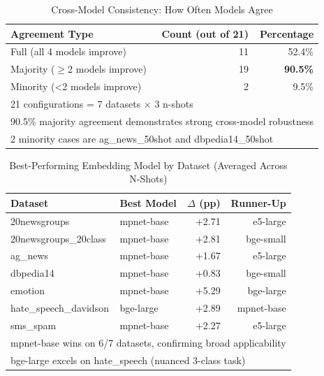 \begin{table}[htbp]
\centering
\caption{Cross-Model Consistency: How Often Models Agree}
\label{tab:embedding_consistency}
\begin{tabular}{lrr}
\toprule
\textbf{Agreement Type} & \textbf{Count (out of 21)} & \textbf{Percentage} \\
\midrule
Full (all 4 models improve)      & 11 & 52.4\% \\
Majority ($\geq$2 models improve) & 19 & \textbf{90.5\%} \\
Minority (<2 models improve)      & 2  & 9.5\% \\
\midrule
\multicolumn{3}{l}{\small 21 configurations = 7 datasets $\times$ 3 n-shots} \\
\multicolumn{3}{l}{\small 90.5\% majority agreement demonstrates strong cross-model robustness} \\
\multicolumn{3}{l}{\small 2 minority cases are ag\_news\_50shot and dbpedia14\_50shot} \\
\bottomrule
\end{tabular}
\end{table}


\begin{table}[htbp]
\centering
\caption{Best-Performing Embedding Model by Dataset (Averaged Across N-Shots)}
\label{tab:embedding_dataset_best}
\begin{tabular}{llrr}
\toprule
\textbf{Dataset} & \textbf{Best Model} & \textbf{$\Delta$ (pp)} & \textbf{Runner-Up} \\
\midrule
20newsgroups                    & mpnet-base & +2.71 & e5-large \\
20newsgroups\_20class           & mpnet-base & +2.81 & bge-small \\
ag\_news                        & mpnet-base & +1.67 & e5-large \\
dbpedia14                       & mpnet-base & +0.83 & bge-small \\
emotion                         & mpnet-base & +5.29 & bge-large \\
hate\_speech\_davidson          & bge-large  & +2.89 & mpnet-base \\
sms\_spam                       & mpnet-base & +2.27 & e5-large \\
\midrule
\multicolumn{4}{l}{\small mpnet-base wins on 6/7 datasets, confirming broad applicability} \\
\multicolumn{4}{l}{\small bge-large excels on hate\_speech (nuanced 3-class task)} \\
\bottomrule
\end{tabular}
\end{table}

